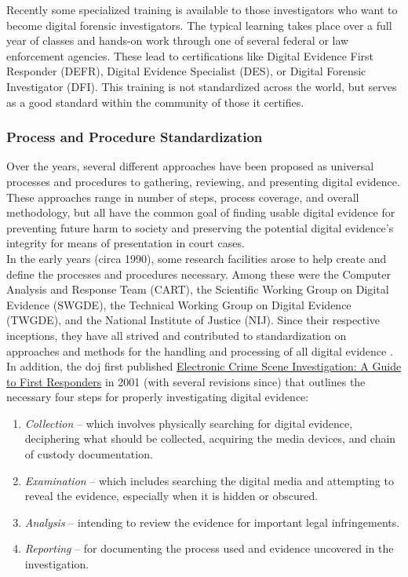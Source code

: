 \documentclass[12pt]{article}
\begin{document}
Recently some specialized training is available to those investigators who want to 
become digital forensic investigators.  The typical learning takes place over
a full year of classes and hands-on work through one of several federal or 
law enforcement agencies.  These lead to certifications like Digital Evidence
First Responder (DEFR), Digital Evidence Specialist (DES), or Digital Forensic
Investigator (DFI).  This training is not standardized across the world, but  
serves as a good standard within the community of those it certifies.\\

\subsubsection{Process and Procedure Standardization}

Over the years, several different approaches have been proposed as universal processes and procedures to
gathering, reviewing, and presenting digital evidence.  These approaches range in number of
steps, process coverage, and overall methodology, 
but all have the common goal of finding usable digital evidence for preventing future
harm to society and preserving the potential digital evidence's 
integrity for means of presentation in court cases.\\

In the early years (circa 1990), some research facilities arose to help create and define the processes
and procedures necessary.  Among these were the Computer Analysis and
Response Team (CART), the Scientific Working Group on Digital Evidence (SWGDE), the
Technical Working Group on Digital Evidence (TWGDE), and the National Institute of
Justice (NIJ).  Since their respective inceptions, they have all strived and 
contributed to standardization on approaches and methods for 
the handling and processing of all digital evidence \cite{noblett2000recovering}.\\

In addition, the \gls{doj} first published 
\uline{Electronic Crime Scene Investigation: A Guide to First Responders}
\cite{ballou2010electronic} in 2001 (with several revisions since) that outlines
the necessary four steps for properly investigating digital evidence:

\vspace{0.5 cm}
\begin{enumerate}
  \item {\em Collection} -- which involves physically searching for digital evidence,
  deciphering what should be collected, acquiring the media devices,
  and chain of custody documentation.
  \item {\em Examination} -- which includes searching the digital media
  and attempting to reveal the evidence, especially when it is
  hidden or obscured.
  \item {\em Analysis} -- intending to review the evidence for important
  legal infringements. 
  \item {\em Reporting} -- for documenting the process used and evidence
  uncovered in the investigation.
\end{enumerate}
\vspace{0.5 cm}
\end{document}
